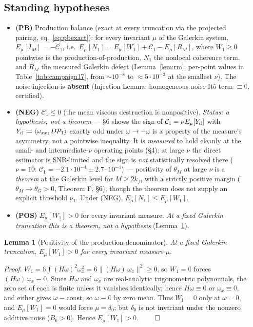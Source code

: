 \documentclass[11pt]{article}
\newtheorem{lemma}[theorem]{Lemma}
\theoremstyle{remark}
\theoremstyle{plain}
\newcommand{\eqdef}{:=}
\begin{document}
\subsection*{Standing hypotheses}

\begin{itemize}
\item \textbf{(PB)} Production balance (exact at every truncation via the projected
  pairing, eq.~\eqref{eq:pbexact}): for every invariant $\mu$ of the Galerkin system,
  $E_\mu[I_M] = -\mathcal{C}_1$, i.e.\
  $E_\mu[N_1] = E_\mu[W_1] + \mathcal{C}_1 - E_\mu[R_M]$, where $W_1 \ge 0$ pointwise is
  the production-of-production, $N_1$ the nonlocal coherence term, and $R_M$ the
  measured Galerkin defect (Lemma~\ref{lem:rm}; per-point values in
  Table~\ref{tab:campaign17}, from $\sim10^{-8}$ to $\approx 5\cdot10^{-3}$ at the
  smallest $\nu$). The noise injection is
  \textbf{absent} (Injection Lemma: homogeneous-noise It\^o term $\equiv 0$, certified).
\item \textbf{(NEG)} $\mathcal{C}_1 \le 0$ (the mean viscous destruction is nonpositive).
  \emph{Status: a hypothesis, not a theorem} --- \S6 shows the sign of
  $\mathcal{C}_1 = \nu E_\mu[Y_{\rm d}]$ with $Y_{\rm d} \eqdef \langle\omega_{xx}, D\mathcal{P}_1\rangle$ exactly odd under $\omega\to-\omega$ is a property of the
  measure's asymmetry, not a pointwise inequality. It is \emph{measured} to hold cleanly at
  the small- and intermediate-$\nu$ operating points (\S4); at large $\nu$ the direct
  estimator is SNR-limited and the sign is \emph{not} statistically resolved there
  ($\nu = 10$: $\mathcal{C}_1 = -2.1\cdot10^{-4} \pm 2.7\cdot10^{-4}$) --- positivity of
  $\theta_M$ at large $\nu$ is a \emph{theorem} at the Galerkin level for $M \ge 2k_f$,
  with a strictly positive margin ($\theta_M \to \theta_G > 0$, Theorem F, \S6), though the
  theorem does not supply an explicit threshold $\nu_1$.
  Under (NEG), $E_\mu[N_1] \le E_\mu[W_1]$.
\item \textbf{(POS)} $E_\mu[W_1] > 0$ for every invariant measure. \emph{At a fixed
  Galerkin truncation this is a theorem, not a hypothesis} (Lemma~\ref{lem:pos}).
\end{itemize}

\begin{lemma}[Positivity of the production denominator]\label{lem:pos}
At a fixed Galerkin truncation, $E_\mu[W_1] > 0$ for every invariant measure $\mu$.
\end{lemma}

\emph{Proof.} $W_1 = 6\int(H\omega)^2\omega_x^2 = 6\|(H\omega)\,\omega_x\|^2 \ge 0$, so $W_1 = 0$
forces $(H\omega)\,\omega_x \equiv 0$. Since $H\omega$ and $\omega_x$ are real-analytic trigonometric
polynomials, the zero set of each is finite unless it vanishes identically; hence $H\omega \equiv 0$
or $\omega_x \equiv 0$, and either gives $\omega \equiv \text{const}$, so $\omega \equiv 0$ by zero
mean. Thus $W_1 = 0$ only at $\omega = 0$, and $E_\mu[W_1] = 0$ would force $\mu = \delta_0$; but
$\delta_0$ is not invariant under the nonzero additive noise ($B_0 > 0$). Hence $E_\mu[W_1] > 0$. $\qed$
\end{document}
